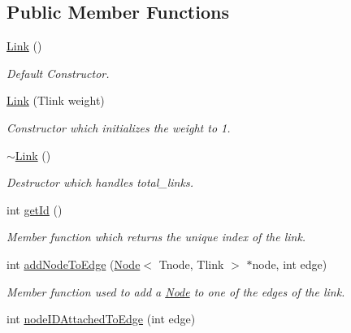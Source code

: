 \subsection*{Public Member Functions}
\begin{DoxyCompactItemize}
\item 
\hyperlink{classLink_aca77f38ecd59de8d21990ac5bbf91a8e}{Link} ()
\begin{DoxyCompactList}\small\item\em Default Constructor. \end{DoxyCompactList}\item 
\hyperlink{classLink_ac99228207446f193a5e4736c6aeb6954}{Link} (Tlink weight)\hypertarget{classLink_ac99228207446f193a5e4736c6aeb6954}{}\label{classLink_ac99228207446f193a5e4736c6aeb6954}

\begin{DoxyCompactList}\small\item\em Constructor which initializes the weight to 1. \end{DoxyCompactList}\item 
\hyperlink{classLink_ad5cb3f4d9cf63f3dd0a150300cce10ad}{$\sim$\+Link} ()
\begin{DoxyCompactList}\small\item\em Destructor which handles total\+\_\+links. \end{DoxyCompactList}\item 
int \hyperlink{classLink_ae082bdae9da5f4c58d91c52af2ea4514}{get\+Id} ()
\begin{DoxyCompactList}\small\item\em Member function which returns the unique index of the link. \end{DoxyCompactList}\item 
int \hyperlink{classLink_aab3ab85eaf576b6eec5634ef542f736f}{add\+Node\+To\+Edge} (\hyperlink{classNode}{Node}$<$ Tnode, Tlink $>$ $\ast$node, int edge)\hypertarget{classLink_aab3ab85eaf576b6eec5634ef542f736f}{}\label{classLink_aab3ab85eaf576b6eec5634ef542f736f}

\begin{DoxyCompactList}\small\item\em Member function used to add a \hyperlink{classNode}{Node} to one of the edges of the link. \end{DoxyCompactList}\item 
int \hyperlink{classLink_ac932e7b1a57c0c9599be513a2106970b}{node\+I\+D\+Attached\+To\+Edge} (int edge)\hypertarget{classLink_ac932e7b1a57c0c9599be513a2106970b}{}\label{classLink_ac932e7b1a57c0c9599be513a2106970b}


\end{DoxyCompactItemize}

